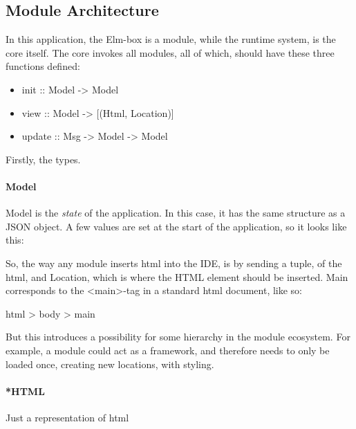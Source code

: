 \subsection{Module Architecture}

In this application, the Elm-box is a module, while the runtime system, is the
core itself. The core invokes all modules, all of which, should have these three
functions defined:




\begin{itemize}
  \item init :: Model -> Model
  \item view :: Model -> [(Html, Location)]
  \item update :: Msg -> Model -> Model
\end{itemize}

Firstly, the types.

\paragraph{Model}
Model is the \textit{state} of the application. In this case, it has the same
structure as a JSON object. A few values are set at the start of the
application, so it looks like this:


So, the way any module inserts \gls{html} into the IDE, is by sending a tuple,
of the \gls{html}, and Location, which is where the HTML element should be
inserted. Main corresponds to the <main>-tag in a standard \gls{html} document,
like so:

html > body > main

But this introduces a possibility for some hierarchy in the module ecosystem.
For example, a module could act as a framework, and therefore needs to only be
loaded once, creating new locations, with styling.


\paragraph{*HTML}
Just a representation of \gls{html}


